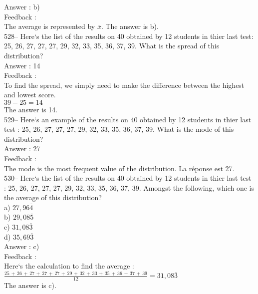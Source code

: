 ﻿\documentclass[letterpaper, 12pt]{article}
\begin{document}
Answer : b)\\

Feedback : \\
The average is represented by $\overline{x}$.  The answer is b).\\

528-- Here`s the list of the results on 40 obtained by 12 students in thier last test: 25, 26, 27, 27, 27, 29, 32, 33, 35, 36, 37, 39.  What is the spread of this distribution?\\

Answer : 14\\

Feedback : \\
To find the spread, we simply need to make the difference between the highest and lowest score. \\
$39-25=14$\\
The answer is 14.\\

529-- Here`s an example of the results on 40 obtained by 12 students in thier last test : 25, 26, 27, 27, 27, 29, 32, 33, 35, 36, 37, 39. What is the mode of this distribution?\\

Answer : 27\\

Feedback : \\
The mode is the most frequent value of the distribution.  La
r\'eponse est 27.\\

530-- Here`s the list of the results on 40 obtained by 12 students in thier last test : 25, 26, 27, 27, 27, 29, 32, 33, 35, 36, 37, 39. Amongst the following, which one is the average of this distribution?\\
a) $27,96\overline{4}$\\
b) $29,08\overline{5}$\\
c) $31,08\overline{3}$\\
d) $35,69\overline{3}$\\

Answer : c) \\

Feedback : \\
Here`s the calculation to find the average :\\[2mm]
$\frac{25\,+\,26\,+\,27\,+\,27\,+\,27\,+\,29\,+\,32\,+\,33\,+\,35\,+\,36\,+\,37\,+\,39}{12}=31,08\overline{3}$\\[2mm]
The answer is c).\\
\end{document}

